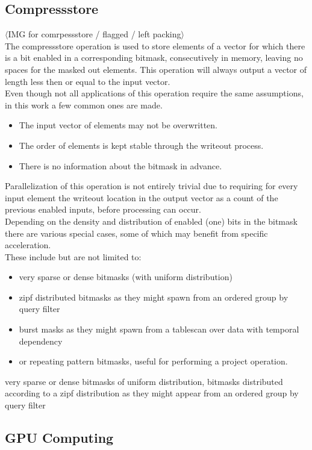 \documentclass{tudscrreprt}
\newcommand{\markr}[1]{\textcolor{review}{$\langle$#1$\rangle$}}
\begin{document}
		\subsection{Compressstore}
			\markr{IMG for comrpessstore / flagged / left packing}\\
			The compressstore operation is used to store elements of a vector for which there is a bit enabled in a corresponding bitmask, consecutively in memory, leaving no spaces for the masked out elements. This operation will always output a vector of length less then or equal to the input vector. \\
			Even though not all applications of this operation require the same assumptions, in this work a few common ones are made.
			\begin{itemize}
				\item The input vector of elements may not be overwritten.
				\item The order of elements is kept stable through the writeout process.
				\item There is no information about the bitmask in advance.
			\end{itemize}
			Parallelization of this operation is not entirely trivial due to requiring for every input element the writeout location in the output vector as a count of the previous enabled inputs, before processing can occur. \\
			Depending on the density and distribution of enabled (one) bits in the bitmask there are various special cases, some of which may benefit from specific acceleration. \\
			These include but are not limited to:
			\begin{itemize}
				\item very sparse or dense bitmasks (with uniform distribution)
				\item zipf distributed bitmasks as they might spawn from an ordered group by query filter
				\item burst masks as they might spawn from a tablescan over data with temporal dependency
				\item or repeating pattern bitmasks, useful for performing a project operation.
			\end{itemize}
			very sparse or dense bitmasks of uniform distribution, bitmasks distributed according to a zipf distribution as they might appear from an ordered group by query filter
		
		\subsection{GPU Computing}
		
\end{document}
